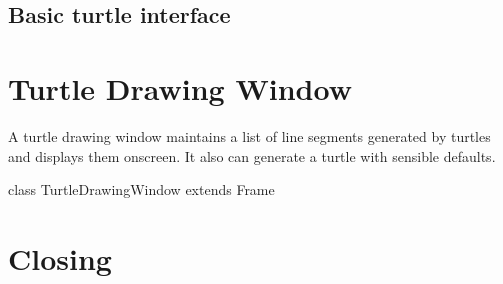 \documentclass{article}
\begin{document}
    \subsection{Basic turtle interface}
      \label{sec:basic-turtle-interface}

      

  \section{Turtle Drawing Window}
    \label{sec:turtle-drawing-window}

    A turtle drawing window maintains a list of line segments generated by turtles and displays them onscreen. It also can generate a turtle with sensible
    defaults.

    \begin{scalacode}
class TurtleDrawingWindow extends Frame {
}
    \end{scalacode}
  
  \section{Closing}
    \label{sec:closing}

    \begin{scalacode}
} // object cheloniidae
    \end{scalacode}

\end{document}
